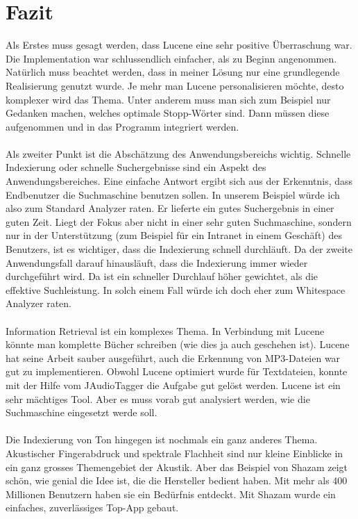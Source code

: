 \documentclass[12pt,a4paper,ngerman]{report}
\begin{document}
\chapter{Fazit}
Als Erstes muss gesagt werden, dass Lucene eine sehr positive Überraschung war. Die Implementation war schlussendlich einfacher, als zu Beginn angenommen. Natürlich muss beachtet werden, dass in meiner Lösung nur eine grundlegende Realisierung genutzt wurde. Je mehr man Lucene personalisieren möchte, desto komplexer wird das Thema. Unter anderem muss man sich zum Beispiel nur Gedanken machen, welches optimale Stopp-Wörter sind. Dann müssen diese aufgenommen und in das Programm integriert werden.\\
\\
Als zweiter Punkt ist die Abschätzung des Anwendungsbereichs wichtig. Schnelle Indexierung oder schnelle Suchergebnisse sind ein Aspekt des Anwendungsbereiches. Eine einfache Antwort ergibt sich aus der Erkenntnis, dass Endbenutzer die Suchmaschine benutzen sollen. In unserem Beispiel würde ich also zum Standard Analyzer raten. Er lieferte ein gutes Suchergebnis in einer guten Zeit. Liegt der Fokus aber nicht in einer sehr guten Suchmaschine, sondern nur in der Unterstützung (zum Beispiel für ein Intranet in einem Geschäft) des Benutzers, ist es wichtiger, dass die Indexierung schnell durchläuft. Da der zweite Anwendungsfall darauf hinausläuft, dass die Indexierung immer wieder durchgeführt wird. Da ist ein schneller Durchlauf höher gewichtet, als die effektive Suchleistung. In solch einem Fall würde ich doch eher zum Whitespace Analyzer raten.\\
\\
Information Retrieval ist ein komplexes Thema. In Verbindung mit Lucene könnte man komplette Bücher schreiben (wie dies ja auch geschehen ist). Lucene hat seine Arbeit sauber ausgeführt, auch die Erkennung von MP3-Dateien war gut zu implementieren. Obwohl Lucene optimiert wurde für Textdateien, konnte mit der Hilfe vom JAudioTagger die Aufgabe gut gelöst werden. Lucene ist ein sehr mächtiges Tool. Aber es muss vorab gut analysiert werden, wie die Suchmaschine eingesetzt werde soll.\\
\\
Die Indexierung von Ton hingegen ist nochmals ein ganz anderes Thema. Akustischer Fingerabdruck und spektrale Flachheit sind nur kleine Einblicke in ein ganz grosses Themengebiet der Akustik. Aber das Beispiel von Shazam zeigt schön, wie genial die Idee ist, die die Hersteller bedient haben. Mit mehr als 400 Millionen Benutzern haben sie ein Bedürfnis entdeckt. Mit Shazam wurde ein einfaches, zuverlässiges Top-App gebaut.
\end{document}
